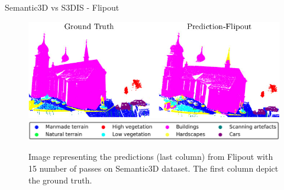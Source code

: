 \documentclass[aspectratio=169]{beamer}
\begin{document}
\begin{frame}{Semantic3D vs S3DIS - Flipout}
    \begin{figure}
        \centering
        \includegraphics[scale=0.5]{images/sem3d/Sem3d_Fout_op.jpg}
        \includegraphics[scale=0.25]{images/legend.jpg}
        \caption{Image representing the predictions (last column) from Flipout with 15 number of passes on Semantic3D dataset. The first column depict the ground truth.}
        \label{fig:sem3d_fout_op}
    \end{figure}
\end{frame}
\end{document}
